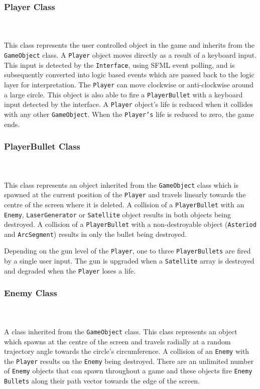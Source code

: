 \documentclass[10pt,twocolumn]{witseiepaper}
\begin{document}
\subsubsection{Player Class}
~\\
~\\
This class represents the user controlled object in the game and inherits from the \texttt{GameObject} class. A \texttt{Player} object moves directly as a result of a keyboard input. This input is detected by the \texttt{Interface}, using SFML event polling, and is  subsequently converted into logic based events which are passed back to the logic layer for interpretation. The \texttt{Player} can move clockwise or anti-clockwise around a large circle. This object is also able to fire a \texttt{PlayerBullet} with a keyboard input detected by the interface. A \texttt{Player} object's life is reduced when it collides with any other \texttt{GameObject}. When the \texttt{Player's} life is reduced to zero, the game ends.

\subsubsection{PlayerBullet Class}
~\\
~\\
This class represents an object inherited from the \texttt{GameObject} class which is spawned at the current position of the \texttt{Player} and travels linearly towards the centre of the screen where it is deleted. A collision of a \texttt{PlayerBullet} with an \texttt{Enemy}, \texttt{LaserGenerator} or \texttt{Satellite} object results in both objects being destroyed. A collision of a \texttt{PlayerBullet} with a non-destroyable object (\texttt{Asteriod} and \texttt{ArcSegment}) results in only the bullet being destroyed.

Depending on the gun level of the \texttt{Player}, one to three \texttt{PlayerBullets} are fired by a single user input. The gun is upgraded when a \texttt{Satellite} array is destroyed and degraded when the \texttt{Player} loses a life.

\subsubsection{Enemy Class}
~\\
~\\
A class inherited from the \texttt{GameObject} class. This class represents an object which spawns at the centre of the screen and travels radially at a random trajectory angle towards the circle's circumference. A collision of an \texttt{Enemy} with the \texttt{Player} results on the \texttt{Enemy} being destroyed. There are an unlimited number of \texttt{Enemy} objects that can spawn throughout a game and these objects fire \texttt{Enemy Bullets} along their path vector towards the edge of the screen.
\end{document}
